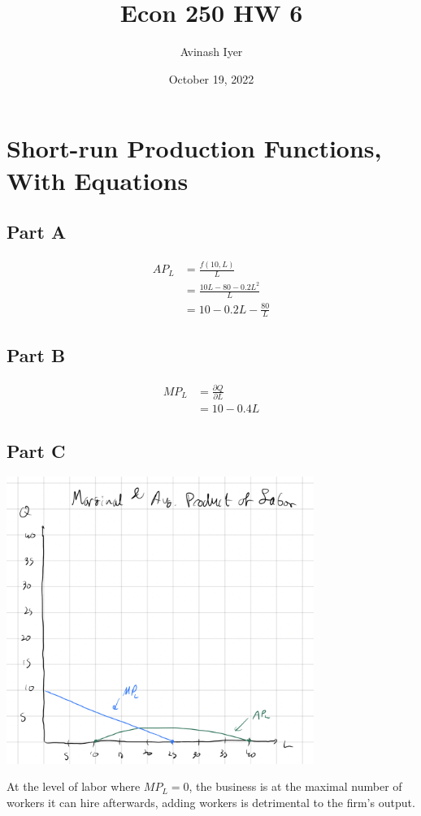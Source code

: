 \documentclass[8pt]{extarticle}
\title{Econ 250 HW 6}
\author{Avinash Iyer}
\date{October 19, 2022}
\begin{document}
{
\maketitle
\section{Short-run Production Functions, With Equations}
\subsection*{Part A}
\begin{align*}
	AP_{L} &= \frac{f(10,L)}{L} \\
	&= \frac{10L - 80 -0.2L^2}{L} \\
	&= 10-0.2L - \frac{80}{L}
\end{align*}
\subsection*{Part B}
\begin{align*}
	MP_L &= \frac{\partial Q}{\partial L} \\
	&= 10-0.4L
\end{align*}
\subsection*{Part C}
\begin{center}
	\includegraphics[width=10cm]{HW6Q1C}
\end{center}
At the level of labor where $MP_L = 0$, the business is at the maximal number of workers it can hire \textemdash afterwards, adding workers is detrimental to the firm's output.
}
\end{document}
